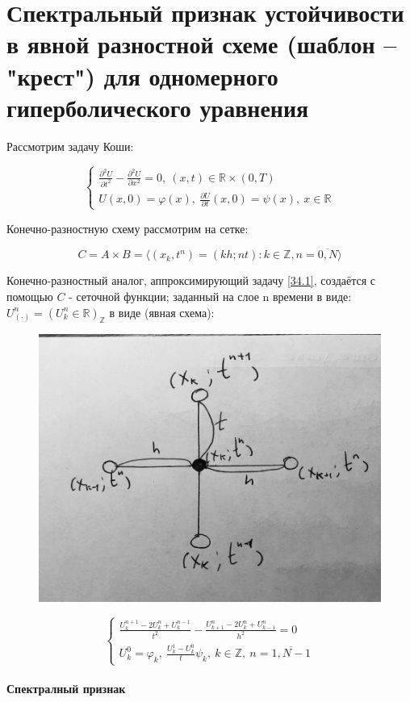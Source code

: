 \documentclass[__main__.tex]{subfiles}
\begin{document}
\section{Спектральный признак устойчивости в явной разностной схеме (шаблон -- "крест") для одномерного гиперболического уравнения}

Рассмотрим задачу Коши:

\begin{equation} \label{34.1}
\begin{cases}
\frac{\partial^2 U}{\partial t^2} - \frac{\partial^2 U}{\partial x^2} = 0, \ \left(x,t\right) \in \mathbb{R} \times \left(0,T\right) \\
U \left(x,0\right) = \varphi \left(x\right), \ \frac{\partial U}{\partial t} \left(x,0\right) = \psi \left(x\right), \ x\in \mathbb{R}
\end{cases}
\end{equation}

Конечно-разностную схему рассмотрим на сетке:

$$
C = A \times B = \langle \left(x_k, t^n\right) = \left(k h; n t\right): k \in \mathbb{Z}, n = \overline{0,N} \rangle
$$

Конечно-разностный аналог, аппроксимирующий задачу \ref{34.1}, создаётся с помощью $C$ - сеточной функции; заданный на слое n времени в виде: $U^n_{\left(\cdot\right)} = \left(U^n_k \in\mathbb{R}\right)_{\mathbb{Z}}$ в виде (явная схема):

\begin{figure}[h!]
	\centering
	\includegraphics[width=0.03\linewidth]{img/img_34.1.jpg}
	\caption{}
	\label{img_34.1}
\end{figure}

\begin{equation}\label{34.2}
\begin{cases}
\frac{U^{n+1}_k - 2U^n_k+U^{n-1}_k}{t^2} - \frac{U^n_{k+1} -2U^n_k+U^n_{k-1}}{h^2} = 0 \\
U^0_k = \varphi_k, \ \frac{U^1_k - U^0_k}{t} \psi_k, \ k\in\mathbb{Z}, \ n = \overline{1,N-1}
\end{cases}
\end{equation}

\paragraph{Спектралный признак}
\end{document}
